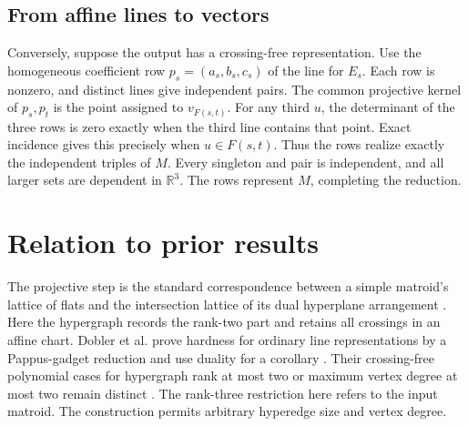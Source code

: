 \documentclass[11pt,a4paper]{amsart}
\begin{document}
\subsection{From affine lines to vectors}
Conversely, suppose the output has a crossing-free representation. Use the homogeneous coefficient row $p_s=(a_s,b_s,c_s)$ of the line for $E_s$. Each row is nonzero, and distinct lines give independent pairs. The common projective kernel of $p_s,p_t$ is the point assigned to $v_{F(s,t)}$. For any third $u$, the determinant of the three rows is zero exactly when the third line contains that point. Exact incidence gives this precisely when $u\in F(s,t)$. Thus the rows realize exactly the independent triples of $M$. Every singleton and pair is independent, and all larger sets are dependent in $\mathbb R^3$. The rows represent $M$, completing the reduction.

\section{Relation to prior results}
The projective step is the standard correspondence between a simple matroid's lattice of flats and the intersection lattice of its dual hyperplane arrangement \cite[\S2.1]{kuhne}. Here the hypergraph records the rank-two part and retains all crossings in an affine chart. Dobler et al. prove hardness for ordinary line representations by a Pappus-gadget reduction and use duality for a corollary \cite[Theorem 2 and Corollary 1]{dobleretal}. Their crossing-free polynomial cases for hypergraph rank at most two or maximum vertex degree at most two remain distinct \cite[Theorems 7 and 8]{dobleretal}. The rank-three restriction here refers to the input matroid. The construction permits arbitrary hyperedge size and vertex degree.



\end{document}
